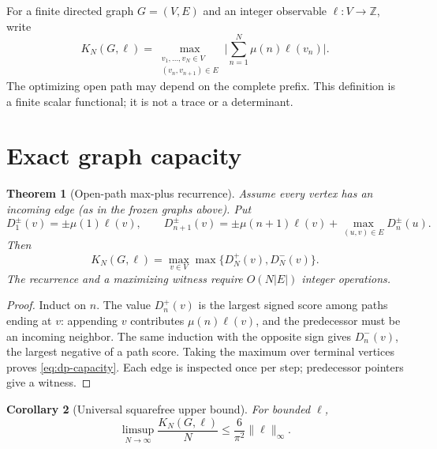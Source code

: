 \documentclass[11pt]{article}
\newtheorem{theorem}{Theorem}[section]
\newtheorem{corollary}[theorem]{Corollary}
\theoremstyle{definition}
\theoremstyle{remark}
\newcommand{\Mob}{\mu}
\newcommand{\ellobs}{\ell}
\newcommand{\abs}[1]{\lvert#1\rvert}
\begin{document}
For a finite directed graph \(G=(V,E)\) and an integer observable
\(\ellobs:V\to\mathbb Z\), write
\begin{equation}
 K_N(G,\ellobs)=
 \max_{\substack{v_1,\ldots,v_N\in V\\(v_n,v_{n+1})\in E}}
 \abs{\sum_{n=1}^N \Mob(n)\ellobs(v_n)}.
 \label{eq:capacity}
\end{equation}
The optimizing open path may depend on the complete prefix.  This definition
is a finite scalar functional; it is not a trace or a determinant.

\section{Exact graph capacity}

\begin{theorem}[Open-path max-plus recurrence]
Assume every vertex has an incoming edge (as in the frozen graphs above).  Put
\begin{equation}
D_1^{\pm}(v)=\pm\Mob(1)\ellobs(v),
\qquad
D_{n+1}^{\pm}(v)=\pm\Mob(n+1)\ellobs(v)
 +\max_{(u,v)\in E}D_n^{\pm}(u).
\label{eq:dp}
\end{equation}
Then
\begin{equation}
K_N(G,\ellobs)=\max_{v\in V}\max\{D_N^+(v),D_N^-(v)\}.
\label{eq:dp-capacity}
\end{equation}
The recurrence and a maximizing witness require \(O(N\abs{E})\) integer
operations.
\end{theorem}

\begin{proof}
Induct on \(n\).  The value \(D_n^+(v)\) is the largest signed score among
paths ending at \(v\): appending \(v\) contributes
\(\Mob(n)\ellobs(v)\), and the predecessor must be an incoming neighbor.
The same induction with the opposite sign gives \(D_n^-(v)\), the largest
negative of a path score.  Taking the maximum over terminal vertices proves
\eqref{eq:dp-capacity}.  Each edge is inspected once per step; predecessor
pointers give a witness.
\end{proof}

\begin{corollary}[Universal squarefree upper bound]
For bounded \(\ellobs\),
\begin{equation}
\limsup_{N\to\infty}\frac{K_N(G,\ellobs)}N
\leq \frac{6}{\pi^2}\|\ellobs\|_\infty.
\label{eq:upper}
\end{equation}
\end{corollary}
\end{document}
